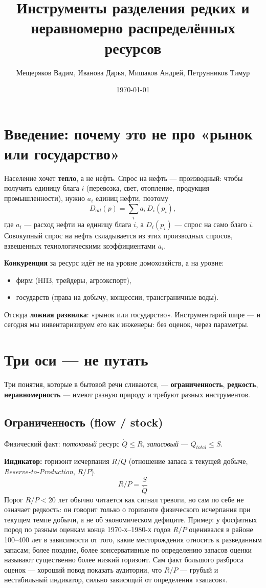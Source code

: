 \documentclass[11pt]{article}
\title{Инструменты разделения редких и\\ неравномерно распределённых ресурсов}
\author{Мещеряков Вадим, Иванова Дарья, Мишаков Андрей, Петрунников Тимур}
\date{\today}
\begin{document}
\maketitle

\section{Введение: почему это не про «рынок или государство»}

Население хочет \textbf{тепло}, а не нефть. Спрос на нефть — производный: чтобы получить единицу блага $i$ (перевозка, свет, отопление, продукция промышленности), нужно $a_i$ единиц нефти, поэтому
\[
D_{oil}(p) = \sum_{i} a_i\, D_i(p_i),
\]
где $a_i$ — расход нефти на единицу блага $i$, а $D_i(p_i)$ — спрос на само благо $i$. Совокупный спрос на нефть складывается из этих производных спросов, взвешенных технологическими коэффициентами $a_i$.

\textbf{Конкуренция} за ресурс идёт не на уровне домохозяйств, а на уровне:
\begin{itemize}
\item фирм (НПЗ, трейдеры, агроэкспорт),
\item государств (права на добычу, концессии, трансграничные воды).
\end{itemize}

Отсюда \textbf{ложная развилка}: «рынок или государство». Инструментарий шире — и сегодня мы инвентаризируем его как инженеры: без оценок, через параметры.

\section{Три оси — не путать}

Три понятия, которые в бытовой речи сливаются, — \textbf{ограниченность}, \textbf{редкость}, \textbf{неравномерность} — имеют разную природу и требуют разных инструментов.

\subsection{Ограниченность (flow / stock)}
Физический факт: \emph{потоковый} ресурс $\dot{Q} \le R$, \emph{запасовый} — $Q_{total} \le S$.

\textbf{Индикатор:} горизонт исчерпания $R/Q$ (отношение запаса к текущей добыче, \emph{Reserve-to-Production}, $R/P$).
\[
R/P = \frac{S}{\dot{Q}}
\]
Порог $R/P < 20$ лет обычно читается как сигнал тревоги, но сам по себе не означает редкость: он говорит только о горизонте физического исчерпания при текущем темпе добычи, а не об экономическом дефиците. Пример: у фосфатных пород по разным оценкам конца 1970-х--1980-х годов $R/P$ оценивался в районе 100--400 лет в зависимости от того, какие месторождения относить к разведанным запасам; более поздние, более консервативные по определению запасов оценки называют существенно более низкий горизонт. Сам факт большого разброса оценок — хороший повод показать аудитории, что $R/P$ — грубый и нестабильный индикатор, сильно зависящий от определения «запасов».
\end{document}

